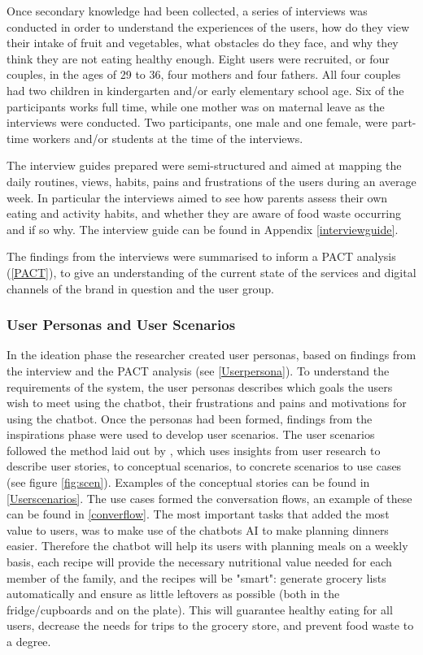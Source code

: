    Once secondary knowledge had been collected, a series of interviews was conducted in order to understand the experiences of the users, how do they view their intake of fruit and vegetables, what obstacles do they face, and why they think they are not eating healthy enough. Eight users were recruited, or four couples, in the ages of 29 to 36, four mothers and four fathers. All four couples had two children in kindergarten and/or early elementary school age. Six of the participants works full time, while one mother was on maternal leave as the interviews were conducted. Two participants, one male and one female, were part-time workers and/or students at the time of the interviews.
   
   The interview guides prepared were semi-structured and aimed at mapping the daily routines, views, habits, pains and frustrations of the users during an average week. In particular the interviews aimed to see how parents assess their own eating and activity habits, and whether they are aware of food waste occurring and if so why. The interview guide can be found in Appendix \ref{interviewguide}. 
   
   The findings from the interviews were summarised to inform a PACT analysis (\ref{PACT}), to give an understanding of the current state of the services and digital channels of the brand in question and the user group.

\vspace{2,5mm} %

    \subsubsection{User Personas and User Scenarios}
        \label{persscen}
    In the ideation phase the researcher created user personas, based on findings from the interview and the PACT analysis (see \ref{Userpersona}). To understand the requirements of the system, the user personas describes which goals the users wish to meet using the chatbot, their frustrations and pains and motivations for using the chatbot. Once the personas had been formed, findings from the inspirations phase were used to develop user scenarios. The user scenarios followed the method laid out by \cite{Benyon2014}, which uses insights from user research to describe user stories, to conceptual scenarios, to concrete scenarios to use cases (see figure \ref{fig:scen}). Examples of the conceptual stories can be found in \ref{Userscenarios}. The use cases formed the conversation flows, an example of these can be found in \ref{converflow}. The most important tasks that added the most value to users, was to make use of the chatbots AI to make planning dinners easier. Therefore the chatbot will help its users with planning meals on a weekly basis, each recipe will provide the necessary nutritional value needed for each member of the family, and the recipes will be "smart": generate grocery lists automatically and ensure as little leftovers as possible (both in the fridge/cupboards and on the plate). This will guarantee healthy eating for all users, decrease the needs for trips to the grocery store, and prevent food waste to a degree.
    
